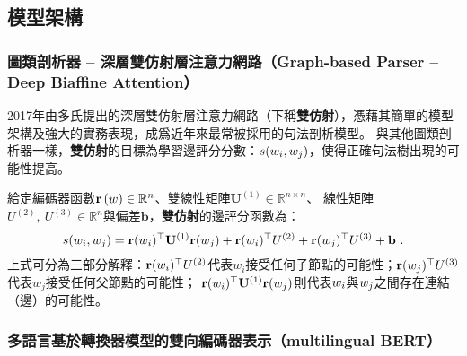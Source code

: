 \subsection{模型架構}

\subsubsection{圖類剖析器 -- 深層雙仿射層注意力網路（Graph-based Parser -- Deep Biaffine Attention）}

2017年由多氏\cite{Dozat2017DeepBA}提出的深層雙仿射層注意力網路（下稱\textbf{雙仿射}），憑藉其簡單的模型架構及強大的實務表現，成爲近年來最常被採用的句法剖析模型。
與其他圖類剖析器一樣，\textbf{雙仿射}的目標為學習邊評分分數：$s(w_{i}, w_{j})$，使得正確句法樹出現的可能性提高。

給定編碼器函數$\mathbf{r}\left(w\right) \in \mathbb{R}^{n}$、雙線性矩陣$\mathbf{U}^{(1)} \in \mathbb{R}^{n \times n}$、
線性矩陣$U^{(2)},\ U^{(3)} \in \mathbb{R}^{n} $與偏差$\mathbf{b}$，\textbf{雙仿射}的邊評分函數為：
\begin{equation}
    s(w_{i}, w_{j}) = \mathbf{r}(w_{i})^{\top} \mathbf{U}^{(1)} \mathbf{r}(w_{j}) + \mathbf{r}(w_{i})^{\top} U^{(2)} + \mathbf{r}(w_{j})^{\top} U^{(3)} + \mathbf{b}\ .
\end{equation}
上式可分為三部分解釋：$\mathbf{r}(w_{i})^{\top} U^{(2)}$代表$w_{i}$接受任何子節點的可能性；$\mathbf{r}(w_{j})^{\top} U^{(3)}$代表$w_{j}$接受任何父節點的可能性；
$\mathbf{r}(w_{i})^{\top} \mathbf{U}^{(1)} \mathbf{r}(w_{j})$則代表$w_{i}$與$w_{j}$之間存在連結（邊）的可能性。

\subsubsection{多語言基於轉換器模型的雙向編碼器表示（multilingual BERT）}

